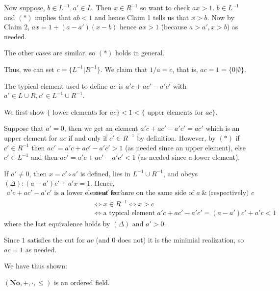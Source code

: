 Now suppose, $b\in L^{-1}, a'\in L$. Then $x\in R^{-1}$ so want to check $ax > 1$.
$b\in L^{-1}$ and $(*)$ implies that $ab < 1$ and hence Claim 1 tells us that $x > b$. Now by Claim 2, $ax = 1 + (a-a')(x-b)$ hence $ax > 1$ (because $a>a', x>b$) as needed.

The other cases are similar, so $(*)$ holds in general.

Thus, we can set $c = \{L^{-1} | R^{-1} \}$. We claim that $1/a = c$, that is, $ac = 1 = \{0 | \emptyset\}$.

The typical element used to define $ac$ is $a'c + ac' - a'c'$ with $a'\in L\cup R, c'\in L^{-1}\cup R^{-1}$.

We first show $\{\text{ lower elements for }ac\} < 1 < \{\text{ upper elements for }ac \}$.

Suppose that $a' = 0$, then we get an element $a'c + ac' - a'c' = ac'$ which is an upper element for $ac$ if and only if $c'\in R^{-1}$ by definition. However, by $(*)$ if $c'\in R^{-1}$ then $ac' = a'c + ac' - a'c' > 1$ (as needed since an upper element), else $c'\in L^{-1}$ and then $ac' = a'c + ac' - a'c' < 1$ (as needed since a lower element).

If $a'\neq 0$, then $x = c'\circ a'$ is defined, lies in $L^{-1}\cup R^{-1}$, and obeys $(\Delta): (a-a')c' + a'x = 1$. Hence,
\begin{align*}
a'c + ac' - a'c' \text{ is a lower element for } ac &\Leftrightarrow a' \ \&\ c' \text{ are on the same side of } a \ \&\ \text{(respectively) } c \\
&\Leftrightarrow x\in R^{-1} \Leftrightarrow x > c \\
&\Leftrightarrow \text{a typical element } a'c + ac' - a'c' = (a-a')c' + a'c < 1
\end{align*}
where the last equivalence holds by $(\Delta)$ and $a'>0$.

Since $1$ satisfies the cut for $ac$ (and $0$ does not) it is the minimial realization, so $ac = 1$ as needed.

We have thus shown:

\begin{theorem} %
$(\mathbf{No}, +, \cdot, \leq)$ is an ordered field.
 \end{theorem}
